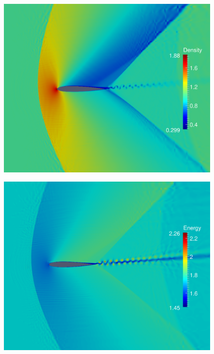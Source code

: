 \begin{figure}
\centering
\begin{minipage}[t]{.5\textwidth}
  \centering
  \includegraphics[width=.85\linewidth]{./figures/density-t1050010-jet}
  \label{fig:visM1pt2-density}
\end{minipage}%
\begin{minipage}[t]{.5\textwidth}
  \centering
  \includegraphics[width=.85\linewidth]{./figures/energy-t1050010-jet}
  \label{fig:visM1pt2-energy}
\end{minipage}
\end{figure} 

